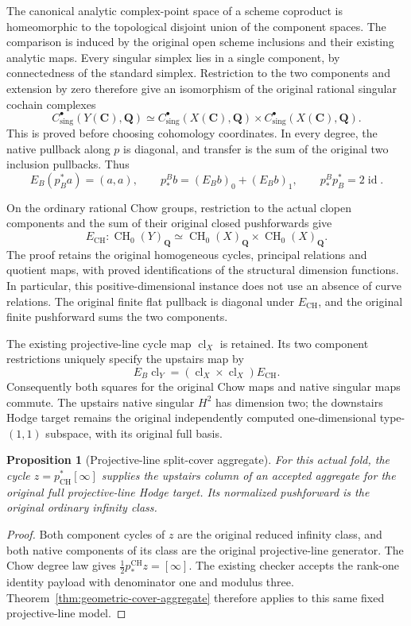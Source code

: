 \documentclass[11pt]{article}
\newtheorem{proposition}[theorem]{Proposition}
\theoremstyle{definition}
\theoremstyle{remark}
\DeclareMathOperator{\CH}{CH}
\begin{document}
The canonical analytic complex-point space of a scheme coproduct is
homeomorphic to the topological disjoint union of the component spaces.
The comparison is induced by the original open scheme inclusions and
their existing analytic maps. Every singular simplex lies in a single
component, by connectedness of the standard simplex. Restriction to the
two components and extension by zero therefore give an isomorphism of
the original rational singular cochain complexes
\[
 C^\bullet_{\mathrm{sing}}(Y(\mathbf C),\mathbf Q)
 \simeq C^\bullet_{\mathrm{sing}}(X(\mathbf C),\mathbf Q)
             \times C^\bullet_{\mathrm{sing}}(X(\mathbf C),\mathbf Q).
\]
This is proved before choosing cohomology coordinates. In every degree,
the native pullback along \(p\) is diagonal, and transfer is the sum of
the original two inclusion pullbacks. Thus
\[
 E_B(p_B^*a)=(a,a),\qquad
 p_*^B b=(E_Bb)_0+(E_Bb)_1,\qquad p_*^Bp_B^*=2\operatorname{id}.
\]

On the ordinary rational Chow groups, restriction to the actual clopen
components and the sum of their original closed pushforwards give
\[
 E_{\CH}:\CH_0(Y)_{\mathbf Q}
       \simeq\CH_0(X)_{\mathbf Q}\times\CH_0(X)_{\mathbf Q}.
\]
The proof retains the original homogeneous cycles, principal relations
and quotient maps, with proved identifications of the structural
dimension functions. In particular, this positive-dimensional instance
does not use an absence of curve relations. The original finite flat
pullback is diagonal under \(E_{\CH}\), and the original finite
pushforward sums the two components.

The existing projective-line cycle map \(\operatorname{cl}_X\) is
retained. Its two component restrictions uniquely specify the upstairs
map by
\[
 E_B\operatorname{cl}_Y
   =(\operatorname{cl}_X\times\operatorname{cl}_X)E_{\CH}.
\]
Consequently both squares for the original Chow maps and native singular
maps commute. The upstairs native singular \(H^2\) has dimension two;
the downstairs Hodge target remains the original independently computed
one-dimensional type-\((1,1)\) subspace, with its original full basis.

\begin{proposition}[Projective-line split-cover aggregate]
\label{prop:p1-double-cover-aggregate}
For this actual fold, the cycle \(z=p_{\CH}^*[\infty]\) supplies the
upstairs column of an accepted aggregate for the original full
projective-line Hodge target. Its normalized pushforward is the original
ordinary infinity class.
\end{proposition}
\begin{proof}
Both component cycles of \(z\) are the original reduced infinity class,
and both native components of its class are the original projective-line
generator. The Chow degree law gives
\(\tfrac12p_*^{\CH}z=[\infty]\). The existing checker accepts the
rank-one identity payload with denominator one and modulus three.
Theorem~\ref{thm:geometric-cover-aggregate} therefore applies to this
same fixed projective-line model.
\end{proof}
\end{document}
